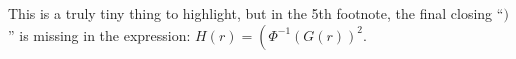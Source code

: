 \documentclass[12pt]{article}
\begin{document}

\hrulefill\hspace{0.5em}\dotfill\hspace{0.5em}\hrulefill

This is a truly tiny thing to highlight, 
but in the 5th footnote, the final closing ``$)$''
is missing in the expression: $H(r)=\left(\Phi^{-1}(G(r))^2\right.$.
\end{document}
